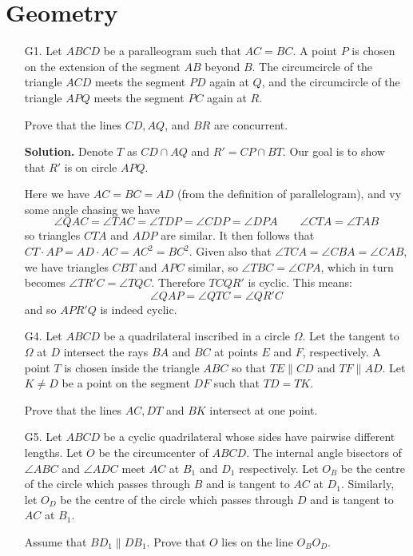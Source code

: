 \documentclass[11pt,a4paper]{article}
\begin{document}
	\section*{Geometry}
	\begin{enumerate}
		\item [G1.]  Let $ABCD$ be a paralleogram such that $AC = BC$. A point $P$ is chosen on the extension of the segment $AB$ beyond $B$. 
		The circumcircle of the triangle $ACD$ meets the segment $PD$ again at $Q$, and the circumcircle of the triangle $APQ$ meets the segment $PC$ again at $R$.
		
		Prove that the lines $CD, AQ$, and $BR$ are concurrent.
		
		\textbf{Solution.} 
		Denote $T$ as $CD\cap AQ$ and $R'=CP\cap BT$. Our goal is to show that $R'$ is on circle $APQ$. 
		 
		Here we have $AC=BC=AD$ (from the definition of parallelogram), and vy some angle chasing we have 
		\[
		\angle QAC = \angle TAC = \angle TDP = \angle CDP = \angle DPA
		\qquad 
		\angle CTA = \angle TAB
		\]
		so triangles $CTA$ and $ADP$ are similar. It then follows that $CT\cdot AP = AD\cdot AC = AC^2=BC^2$. 
		Given also that $\angle TCA = \angle CBA=\angle CAB$, we have triangles $CBT$ and $APC$ similar, so $\angle TBC = \angle CPA$, which in turn becomes 
		$\angle TR'C=\angle TQC$. Therefore $TCQR'$ is cyclic. 
		This means: 
		\[
		\angle QAP = \angle QTC = \angle QR'C
		\]
		and so $APR'Q$ is indeed cyclic. 
		
		\item [G4.] 
		Let $ABCD$ be a quadrilateral inscribed in a circle $\Omega$. 
		Let the tangent to $\Omega$ at $D$ intersect the rays $BA$ and $BC$ at points $E$ and $F$, respectively. 
		A point $T$ is chosen inside the triangle $ABC$ so that $TE \parallel CD$ and $TF \parallel AD$. Let $K \neq D$ be a point on the segment $DF$ such that $TD = TK$.
		
		Prove that the lines $AC, DT$ and $BK$ intersect at one point.
		
		\item [G5.]
		Let $ABCD$ be a cyclic quadrilateral whose sides have pairwise different lengths. 
		Let $O$ be the circumcenter of $ABCD$. 
		The internal angle bisectors of $\angle ABC$ and $\angle ADC$ meet $AC$ at $B_1$ and $D_1$ respectively. 
		Let $O_B$ be the centre of the circle which passes through $B$ and is tangent to $AC$ at $D_1$. 
		Similarly, let $O_D$ be the centre of the circle which passes through $D$ and is tangent to $AC$ at $B_1$.
		
		Assume that $BD_1 \parallel DB_1$. Prove that $O$ lies on the line $O_BO_D$.
		
	\end{enumerate}
	
\end{document}
